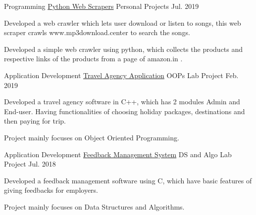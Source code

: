 \begin{cventries}
  \cventry
    {Programming} %
    {\href{https://github.com/AbhiSaphire/Web-Scrapers}{Python Web Scrapers}} %
    {Personal Projects} %
    {Jul. 2019} %
    {
      \begin{cvitems} %
        \item {Developed a web crawler which lets user download or listen to songs, this web scraper crawls www.mp3download.center to search the songs.}
        \item {Developed a simple web crawler using python, which collects the products and respective links of the products from a page of amazon.in .}
      \end{cvitems}
    }

  \cventry
    {Application Development} %
    {\href{https://github.com/AbhiSaphire/TravelAgency}{Travel Agency Application}} %
    {OOPs Lab Project} %
    {Feb. 2019} %
    {
      \begin{cvitems} %
        \item {Developed a travel agency software in C++, which has 2 modules Admin and End-user. Having functionalities of choosing holiday packages, destinations and then paying for trip.}
        \item {Project mainly focuses on Object Oriented Programming.}
      \end{cvitems}
    }

  \cventry
    {Application Development} %
    {\href{https://github.com/AbhiSaphire/FeedbackManagement}{Feedback Management System}} %
    {DS and Algo Lab Project} %
    {Jul. 2018} %
    {
      \begin{cvitems} %
        \item {Developed a feedback management software using C, which have basic features of giving feedbacks for employers.}
        \item {Project mainly focuses on Data Structures and Algorithms.}
      \end{cvitems}
    }

  \cventry
    {} %
    {} %
    {} %
    {} %
    {}

\end{cventries}
